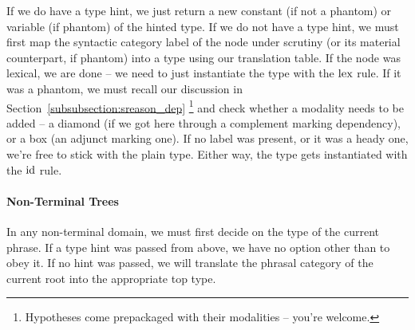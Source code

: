 If we do have a type hint, we just return a new constant (if not a phantom) or variable (if phantom) of the hinted type.
If we do not have a type hint, we must first map the syntactic category label of the node under scrutiny (or its material counterpart, if phantom) into a type using our translation table.
If the node was lexical, we are done -- we need to just instantiate the type with the $\mathrm{lex}$ rule.
If it was a phantom, we must recall our discussion in Section~\ref{subsubsection:sreason_dep}%
	\footnote{Hypotheses come prepackaged with their modalities -- you're welcome.}
and check whether a modality needs to be added -- a diamond (if we got here through a complement marking dependency), or a box (an adjunct marking one).
If no label was present, or it was a heady one, we're free to stick with the plain type.
Either way, the type gets instantiated with the $\mathrm{id}$ rule.

\paragraph{Non-Terminal Trees}
In any non-terminal domain, we must first decide on the type of the current phrase.
If a type hint was passed from above, we have no option other than to obey it.
If no hint was passed, we will translate the phrasal category of the current root into the appropriate top type.

